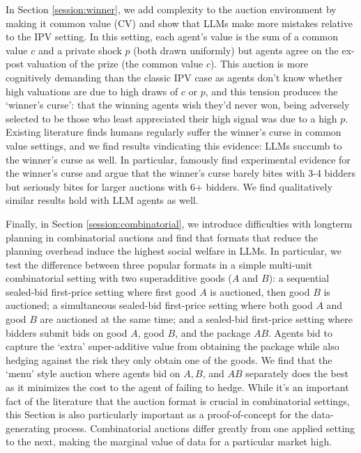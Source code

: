 \documentclass{article} %
\begin{document}
In Section \ref{session:winner}, we add complexity to the auction environment by making it common value (CV) and show that LLMs make more mistakes relative to the IPV setting. 
In this setting, each agent's value is the sum of a common value $c$ and a private shock $p$ (both drawn uniformly) but agents agree on the ex-post valuation of the prize (the common value $c$). 
This auction is more cognitively demanding than the classic IPV case as agents don't know whether high valuations are due to high draws of $c$ or $p$, and this tension produces the `winner's curse': that the winning agents wish they'd never won, being adversely selected to be those who least appreciated their high signal was due to a high $p$. 
Existing literature finds humans regularly suffer the winner's curse in common value settings, and we find results vindicating this evidence: LLMs succumb to the winner’s curse as well. 
In particular, \citet{kagel1986winner} famously find experimental evidence for the winner’s curse and argue that the winner’s curse barely bites with 3-4 bidders but seriously bites for larger auctions with 6+ bidders. 
We find qualitatively similar results hold with LLM agents as well.

Finally, in Section \ref{session:combinatorial}, we introduce difficulties with longterm planning in combinatorial auctions and find that formats that reduce the planning overhead induce the highest social welfare in LLMs. 
In particular, we test the difference between three popular formats in a simple multi-unit combinatorial setting with two superadditive goods ($A$ and $B$): a sequential sealed-bid first-price setting where first good $A$ is auctioned, then good $B$ is auctioned; a simultaneous sealed-bid first-price setting where both good $A$ and good $B$ are auctioned at the same time; and a sealed-bid first-price setting where bidders submit bids on good $A$, good $B$, and the package $AB$. 
Agents bid to capture the `extra' super-additive value from obtaining the package while also hedging against the risk they only obtain one of the goods. 
We find that the `menu' style auction where agents bid on $A, B$, and $AB$ separately does the best as it minimizes the cost to the agent of failing to hedge. 
While it's an important fact of the literature that the auction format is crucial in combinatorial settings, this Section is also particularly important as a proof-of-concept for the data-generating process. 
Combinatorial auctions differ greatly from one applied setting to the next, making the marginal value of data for a particular market high.
\end{document}
